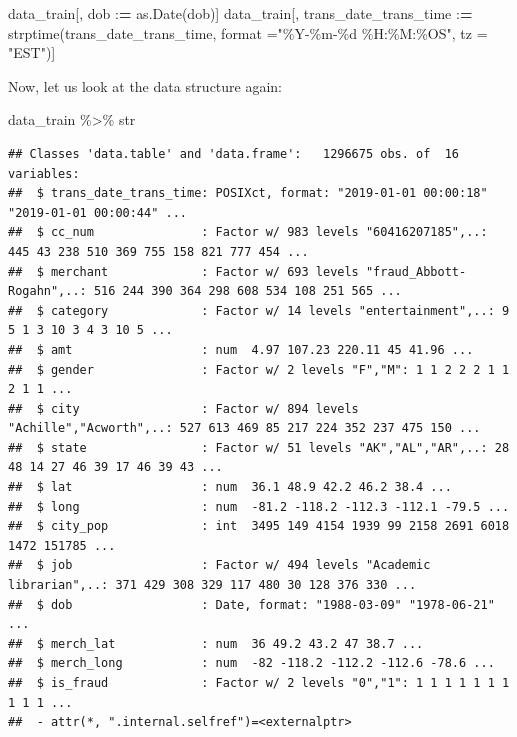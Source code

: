 \documentclass[
]{report}
\newenvironment{Shaded}{\begin{snugshade}}{\end{snugshade}}
\newcommand{\AttributeTok}[1]{\textcolor[rgb]{0.77,0.63,0.00}{#1}}
\newcommand{\ErrorTok}[1]{\textcolor[rgb]{0.64,0.00,0.00}{\textbf{#1}}}
\newcommand{\FunctionTok}[1]{\textcolor[rgb]{0.00,0.00,0.00}{#1}}
\newcommand{\NormalTok}[1]{#1}
\newcommand{\SpecialCharTok}[1]{\textcolor[rgb]{0.00,0.00,0.00}{#1}}
\newcommand{\StringTok}[1]{\textcolor[rgb]{0.31,0.60,0.02}{#1}}
\begin{document}
\begin{Shaded}
\begin{Highlighting}[]
\NormalTok{data\_train[, dob }\SpecialCharTok{:}\ErrorTok{=} \FunctionTok{as.Date}\NormalTok{(dob)]}
\NormalTok{data\_train[, trans\_date\_trans\_time }\SpecialCharTok{:}\ErrorTok{=} \FunctionTok{strptime}\NormalTok{(trans\_date\_trans\_time,}
                                               \AttributeTok{format =}\StringTok{"\%Y{-}\%m{-}\%d \%H:\%M:\%OS"}\NormalTok{, }
                                               \AttributeTok{tz =} \StringTok{"EST"}\NormalTok{)]}
\end{Highlighting}
\end{Shaded}

Now, let us look at the data structure again:

\begin{Shaded}
\begin{Highlighting}[]
\NormalTok{data\_train }\SpecialCharTok{\%\textgreater{}\%}
\NormalTok{  str}
\end{Highlighting}
\end{Shaded}

\begin{verbatim}
## Classes 'data.table' and 'data.frame':   1296675 obs. of  16 variables:
##  $ trans_date_trans_time: POSIXct, format: "2019-01-01 00:00:18" "2019-01-01 00:00:44" ...
##  $ cc_num               : Factor w/ 983 levels "60416207185",..: 445 43 238 510 369 755 158 821 777 454 ...
##  $ merchant             : Factor w/ 693 levels "fraud_Abbott-Rogahn",..: 516 244 390 364 298 608 534 108 251 565 ...
##  $ category             : Factor w/ 14 levels "entertainment",..: 9 5 1 3 10 3 4 3 10 5 ...
##  $ amt                  : num  4.97 107.23 220.11 45 41.96 ...
##  $ gender               : Factor w/ 2 levels "F","M": 1 1 2 2 2 1 1 2 1 1 ...
##  $ city                 : Factor w/ 894 levels "Achille","Acworth",..: 527 613 469 85 217 224 352 237 475 150 ...
##  $ state                : Factor w/ 51 levels "AK","AL","AR",..: 28 48 14 27 46 39 17 46 39 43 ...
##  $ lat                  : num  36.1 48.9 42.2 46.2 38.4 ...
##  $ long                 : num  -81.2 -118.2 -112.3 -112.1 -79.5 ...
##  $ city_pop             : int  3495 149 4154 1939 99 2158 2691 6018 1472 151785 ...
##  $ job                  : Factor w/ 494 levels "Academic librarian",..: 371 429 308 329 117 480 30 128 376 330 ...
##  $ dob                  : Date, format: "1988-03-09" "1978-06-21" ...
##  $ merch_lat            : num  36 49.2 43.2 47 38.7 ...
##  $ merch_long           : num  -82 -118.2 -112.2 -112.6 -78.6 ...
##  $ is_fraud             : Factor w/ 2 levels "0","1": 1 1 1 1 1 1 1 1 1 1 ...
##  - attr(*, ".internal.selfref")=<externalptr>
\end{verbatim}
\end{document}
